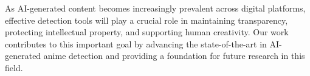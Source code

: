 \documentclass{article}
\begin{document}
As AI-generated content becomes increasingly prevalent across digital platforms, effective detection tools will play a crucial role in maintaining transparency, protecting intellectual property, and supporting human creativity. Our work contributes to this important goal by advancing the state-of-the-art in AI-generated anime detection and providing a foundation for future research in this field.



\end{document}
